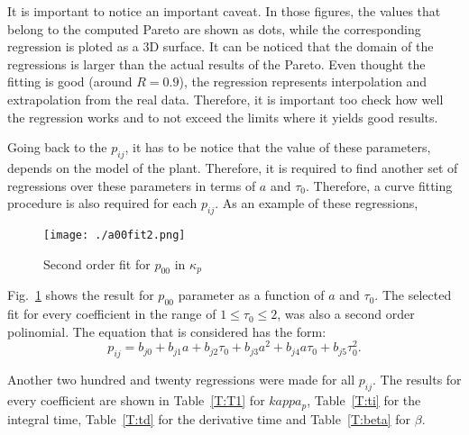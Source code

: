 It is important to notice an important caveat. In those figures, the values that belong to the computed Pareto are shown as dots, while the corresponding regression is ploted as a 3D surface. It can be noticed that the domain of the regressions is larger than the actual results of the Pareto. Even thought the fitting is good (around $R=0.9$), the regression represents interpolation and extrapolation from the real data. Therefore, it is important too check how well the regression works and to not exceed the limits where it yields good results.

Going back to the $p_{ij}$, it has to be notice that the value of these parameters, depends on the model of the plant. Therefore, it is required to find another set of regressions over these parameters in terms of $a$ and $\tau_0$. Therefore, a curve fitting procedure is also required for each $p_{ij}$. As an example of these regressions, 
%
\begin{figure}[tb]
	\centering
	\texttt{[image: ./a00fit2.png]}
	\caption{Second order fit for $p_{00}$ in $\kappa_p$}
	\label{F:coeff}
\end{figure}
%
Fig.~\ref{F:coeff} shows the result for $p_{00}$ parameter as a function of $a$ and $\tau_0$. The selected fit for every coefficient in the range of $1\leq \tau_0 \leq2$, was also a second order polinomial. The equation that is considered has the form:
%
\begin{equation}
p_{ij} = b_{j0}+b_{j1}a+b_{j2} \tau_0+b_{j3}a^2+b_{j4}a \tau_0+b_{j5}\tau_0^2 .
\label{E:coeff}
\end{equation}

Another two hundred and twenty regressions were made for all $p_{ij}$. The results for every coefficient are shown in Table~\ref{T:T1} for $kappa_p$, Table~\ref{T:ti} for the integral time, Table~\ref{T:td} for the derivative time and Table~\ref{T:beta} for $\beta$.

